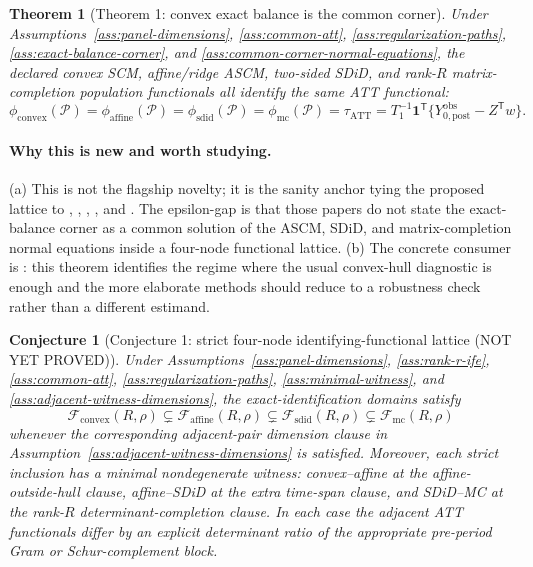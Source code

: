 \documentclass[11pt]{article}
\newcommand{\one}{\mathbf{1}}
\newcommand{\transpose}{\mathsf{T}}
\newcommand{\calF}{\mathcal{F}}
\theoremstyle{definition}
\theoremstyle{plain}
\newtheorem{theorem}{Theorem}
\newtheorem{conjecture}{Conjecture}
\theoremstyle{remark}
\begin{document}
\begin{theorem}[Theorem 1: convex exact balance is the common corner]\label{thm:convex-corner}
Under Assumptions~\ref{ass:panel-dimensions}, \ref{ass:common-att}, \ref{ass:regularization-paths}, \ref{ass:exact-balance-corner}, and \ref{ass:common-corner-normal-equations}, the declared convex SCM, affine/ridge ASCM, two-sided SDiD, and rank-\(R\) matrix-completion population functionals all identify the same ATT functional:
\[
\phi_{\mathrm{convex}}(\mathcal P)=\phi_{\mathrm{affine}}(\mathcal P)
=\phi_{\mathrm{sdid}}(\mathcal P)=\phi_{\mathrm{mc}}(\mathcal P)=
\tau_{\mathrm{ATT}}
=T_1^{-1}\one^\transpose\{Y^{\mathrm{obs}}_{0,\mathrm{post}}-Z^\transpose w\}.
\]
\end{theorem}

\paragraph{Why this is new and worth studying.}
(a) This is not the flagship novelty; it is the sanity anchor tying the proposed lattice to \citet{AbadieDiamondHainmueller2010}, \citet{DoudchenkoImbens2016}, \citet{BenMichaelFellerRothstein2021}, \citet{ArkhangelskyAtheyHirshbergImbensWager2021}, and \citet{AtheyBayatiDoudchenkoImbensKhosravi2021}. The epsilon-gap is that those papers do not state the exact-balance corner as a common solution of the ASCM, SDiD, and matrix-completion normal equations inside a four-node functional lattice. (b) The concrete consumer is \citet{Abadie2021}: this theorem identifies the regime where the usual convex-hull diagnostic is enough and the more elaborate methods should reduce to a robustness check rather than a different estimand.

\begin{conjecture}[Conjecture 1: strict four-node identifying-functional lattice (NOT YET PROVED)]\label{conj:strict-lattice}
Under Assumptions~\ref{ass:panel-dimensions}, \ref{ass:rank-r-ife}, \ref{ass:common-att}, \ref{ass:regularization-paths}, \ref{ass:minimal-witness}, and \ref{ass:adjacent-witness-dimensions}, the exact-identification domains satisfy
\[
\calF_{\mathrm{convex}}(R,\rho)\subsetneq
\calF_{\mathrm{affine}}(R,\rho)\subsetneq
\calF_{\mathrm{sdid}}(R,\rho)\subsetneq
\calF_{\mathrm{mc}}(R,\rho)
\]
whenever the corresponding adjacent-pair dimension clause in Assumption~\ref{ass:adjacent-witness-dimensions} is satisfied. Moreover, each strict inclusion has a minimal nondegenerate witness: convex--affine at the affine-outside-hull clause, affine--SDiD at the extra time-span clause, and SDiD--MC at the rank-\(R\) determinant-completion clause. In each case the adjacent ATT functionals differ by an explicit determinant ratio of the appropriate pre-period Gram or Schur-complement block.
\end{conjecture}
\end{document}
